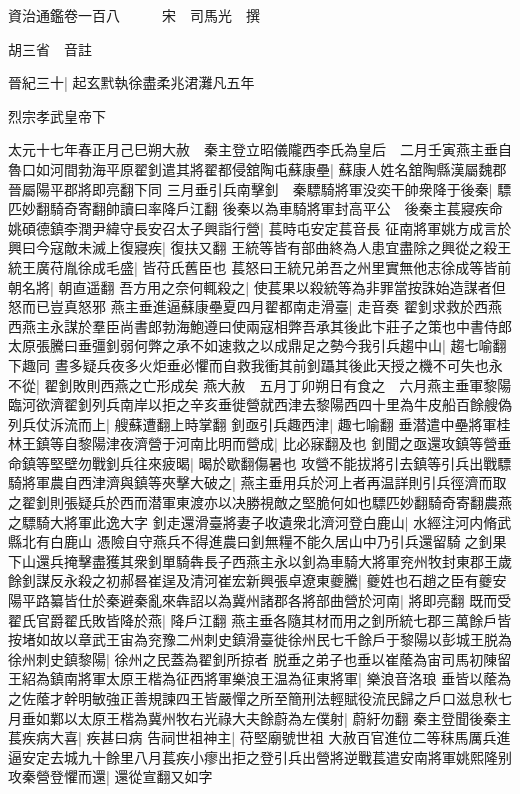 資治通鑑卷一百八　　　宋　司馬光　撰

胡三省　音註

晉紀三十|{
	起玄黓執徐盡柔兆涒灘凡五年}


烈宗孝武皇帝下

太元十七年春正月己巳朔大赦　秦主登立昭儀隴西李氏為皇后　二月壬寅燕主垂自魯口如河間勃海平原翟釗遣其將翟都侵舘陶屯蘇康壘|{
	蘇康人姓名舘陶縣漢屬魏郡晉屬陽平郡將即亮翻下同}
三月垂引兵南擊釗　秦驃騎將軍没奕干帥衆降于後秦|{
	驃匹妙翻騎奇寄翻帥讀曰率降戶江翻}
後秦以為車騎將軍封高平公　後秦主萇寢疾命姚碩德鎮李潤尹緯守長安召太子興詣行營|{
	萇時屯安定萇音長}
征南將軍姚方成言於興曰今寇敵未滅上復寢疾|{
	復扶又翻}
王統等皆有部曲終為人患宜盡除之興從之殺王統王廣苻胤徐成毛盛|{
	皆苻氏舊臣也}
萇怒曰王統兄弟吾之州里實無他志徐成等皆前朝名將|{
	朝直遥翻}
吾方用之奈何輒殺之|{
	使萇果以殺統等為非罪當按誅始造謀者但怒而已豈真怒邪}
燕主垂進逼蘇康壘夏四月翟都南走滑臺|{
	走音奏}
翟釗求救於西燕西燕主永謀於羣臣尚書郎勃海鮑遵曰使兩寇相弊吾承其後此卞莊子之策也中書侍郎太原張騰曰垂彊釗弱何弊之承不如速救之以成鼎足之勢今我引兵趨中山|{
	趨七喻翻下趣同}
晝多疑兵夜多火炬垂必懼而自救我衝其前釗躡其後此天授之機不可失也永不從|{
	翟釗敗則西燕之亡形成矣}
燕大赦　五月丁卯朔日有食之　六月燕主垂軍黎陽臨河欲濟翟釗列兵南岸以拒之辛亥垂徙營就西津去黎陽西四十里為牛皮船百餘艘偽列兵仗泝流而上|{
	艘蘇遭翻上時掌翻}
釗亟引兵趣西津|{
	趣七喻翻}
垂潜遣中壘將軍桂林王鎮等自黎陽津夜濟營于河南比明而營成|{
	比必寐翻及也}
釗聞之亟還攻鎮等營垂命鎮等堅壁勿戰釗兵往來疲暍|{
	暍於歇翻傷暑也}
攻營不能拔將引去鎮等引兵出戰驃騎將軍農自西津濟與鎮等夾擊大破之|{
	燕主垂用兵於河上者再温詳則引兵徑濟而取之翟釗則張疑兵於西而潜軍東渡亦以决勝視敵之堅脆何如也驃匹妙翻騎奇寄翻農燕之驃騎大將軍此逸大字}
釗走還滑臺將妻子收遺衆北濟河登白鹿山|{
	水經注河内脩武縣北有白鹿山}
憑險自守燕兵不得進農曰釗無糧不能久居山中乃引兵還留騎之釗果下山還兵掩擊盡獲其衆釗單騎犇長子西燕主永以釗為車騎大將軍兖州牧封東郡王歲餘釗謀反永殺之初郝晷崔逞及清河崔宏新興張卓遼東夔騰|{
	夔姓也石趙之臣有夔安}
陽平路纂皆仕於秦避秦亂來犇詔以為冀州諸郡各將部曲營於河南|{
	將即亮翻}
既而受翟氏官爵翟氏敗皆降於燕|{
	降戶江翻}
燕主垂各隨其材而用之釗所統七郡三萬餘戶皆按堵如故以章武王宙為兖豫二州刺史鎮滑臺徙徐州民七千餘戶于黎陽以彭城王脱為徐州刺史鎮黎陽|{
	徐州之民蓋為翟釗所掠者}
脱垂之弟子也垂以崔䕃為宙司馬初陳留王紹為鎮南將軍太原王楷為征西將軍樂浪王温為征東將軍|{
	樂浪音洛琅}
垂皆以䕃為之佐䕃才幹明敏強正善規諫四王皆嚴憚之所至簡刑法輕賦役流民歸之戶口滋息秋七月垂如鄴以太原王楷為冀州牧右光祿大夫餘蔚為左僕射|{
	蔚紆勿翻}
秦主登聞後秦主萇疾病大喜|{
	疾甚曰病}
告祠世祖神主|{
	苻堅廟號世祖}
大赦百官進位二等秣馬厲兵進逼安定去城九十餘里八月萇疾小瘳出拒之登引兵出營將逆戰萇遣安南將軍姚熙隆别攻秦營登懼而還|{
	還從宣翻又如字}
